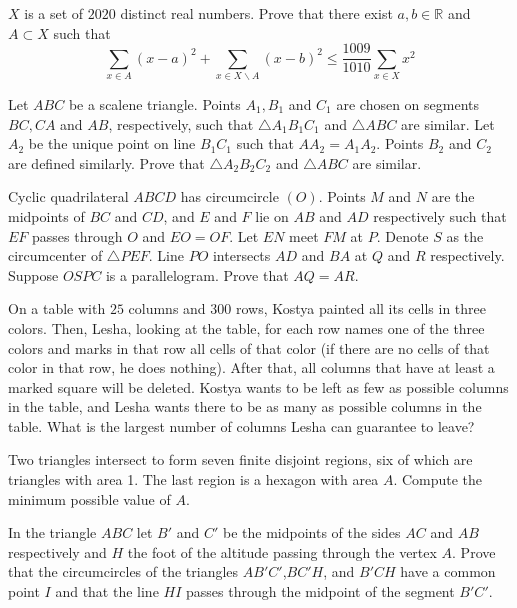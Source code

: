 \documentclass[11pt]{scrartcl}
\begin{document}
\begin{problem}[176031103945886]
	$X$ is a set of $2020$ distinct real numbers. Prove that there exist $a,b\in \mathbb{R}$ and $A\subset X$ such that
$$\sum_{x\in A}(x-a)^2 +\sum_{x\in X\backslash A}(x-b)^2\le \frac{1009}{1010}\sum_{x\in X}x^2$$
\end{problem}
\begin{problem}[3031913484181592371]
Let $ABC$ be a scalene triangle. Points $A_1,B_1$ and $C_1$ are chosen on segments $BC,CA$ and $AB$, respectively, such that $\triangle A_1B_1C_1$ and $\triangle ABC$ are similar. Let $A_2$ be the unique point on line $B_1C_1$ such that $AA_2=A_1A_2$. Points $B_2$ and $C_2$ are defined similarly. Prove that $\triangle A_2B_2C_2$ and $\triangle ABC$ are similar.
\end{problem}
\begin{problem}[6612845742708555351]
	Cyclic quadrilateral $ABCD$ has circumcircle $(O)$. Points $M$ and $N$ are the midpoints of $BC$ and $CD$, and $E$ and $F$ lie on $AB$ and $AD$ respectively such that $EF$ passes through $O$ and $EO=OF$. Let $EN$ meet $FM$ at $P$. Denote $S$ as the circumcenter of $\triangle PEF$. Line $PO$ intersects $AD$ and $BA$ at $Q$ and $R$ respectively. Suppose $OSPC$ is a parallelogram. Prove that $AQ=AR$.
\end{problem}
\begin{problem}[482459214391384]
	On a table with $25$ columns and $300$ rows, Kostya painted all its cells in three colors. Then, Lesha, looking at the table, for each row names one of the three colors and marks in that row all cells of that color (if there are no cells of that color in that row, he does nothing). After that, all columns that have at least a marked square will be deleted.
Kostya wants to be left as few as possible columns in the table, and Lesha wants there to be as many as possible columns in the table. What is the largest number of columns Lesha can guarantee to leave?
\end{problem}
\begin{problem}[1580707630770476037]
Two triangles intersect to form seven finite disjoint regions, six of which are triangles with area 1. The last region is a hexagon with area \(A\). Compute the minimum possible value of \(A\).
\end{problem}
\begin{problem}[7243491713649826569]
In the triangle $ABC$ let $B'$ and $C'$ be the midpoints of the sides $AC$ and $AB$ respectively and $H$ the foot of the altitude passing through the vertex $A$. Prove that the circumcircles of the triangles $AB'C'$,$BC'H$, and $B'CH$ have a common point $I$ and that the line $HI$ passes through the midpoint of the segment $B'C'.$
\end{problem}
\end{document}
